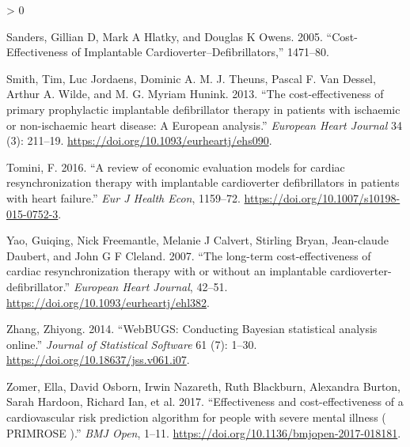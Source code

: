 \documentclass[
]{article}
\newlength{\cslhangindent}
\newenvironment{CSLReferences}[2] %
 {%
  \setlength{\parindent}{0pt}
  \ifodd #1 \everypar{\setlength{\hangindent}{\cslhangindent}}\ignorespaces\fi
  \ifnum #2 > 0
  \setlength{\parskip}{#2\baselineskip}
  \fi
 }%
 {}
\begin{document}
\begin{CSLReferences}{1}{0}
\leavevmode\hypertarget{ref-Sanders2005}{}%
Sanders, Gillian D, Mark A Hlatky, and Douglas K Owens. 2005. {``{Cost-Effectiveness of Implantable Cardioverter--Defibrillators},''} 1471--80.

\leavevmode\hypertarget{ref-Smith2013}{}%
Smith, Tim, Luc Jordaens, Dominic A. M. J. Theuns, Pascal F. Van Dessel, Arthur A. Wilde, and M. G. Myriam Hunink. 2013. {``{The cost-effectiveness of primary prophylactic implantable defibrillator therapy in patients with ischaemic or non-ischaemic heart disease: A European analysis}.''} \emph{European Heart Journal} 34 (3): 211--19. \url{https://doi.org/10.1093/eurheartj/ehs090}.

\leavevmode\hypertarget{ref-Tomini2016}{}%
Tomini, F. 2016. {``{A review of economic evaluation models for cardiac resynchronization therapy with implantable cardioverter defibrillators in patients with heart failure}.''} \emph{Eur J Health Econ}, 1159--72. \url{https://doi.org/10.1007/s10198-015-0752-3}.

\leavevmode\hypertarget{ref-Yao2007}{}%
Yao, Guiqing, Nick Freemantle, Melanie J Calvert, Stirling Bryan, Jean-claude Daubert, and John G F Cleland. 2007. {``{The long-term cost-effectiveness of cardiac resynchronization therapy with or without an implantable cardioverter-defibrillator}.''} \emph{European Heart Journal}, 42--51. \url{https://doi.org/10.1093/eurheartj/ehl382}.

\leavevmode\hypertarget{ref-Zhang2014}{}%
Zhang, Zhiyong. 2014. {``{WebBUGS: Conducting Bayesian statistical analysis online}.''} \emph{Journal of Statistical Software} 61 (7): 1--30. \url{https://doi.org/10.18637/jss.v061.i07}.

\leavevmode\hypertarget{ref-Zomer2017}{}%
Zomer, Ella, David Osborn, Irwin Nazareth, Ruth Blackburn, Alexandra Burton, Sarah Hardoon, Richard Ian, et al. 2017. {``{Effectiveness and cost-effectiveness of a cardiovascular risk prediction algorithm for people with severe mental illness ( PRIMROSE )}.''} \emph{BMJ Open}, 1--11. \url{https://doi.org/10.1136/bmjopen-2017-018181}.

\end{CSLReferences}
\end{document}
